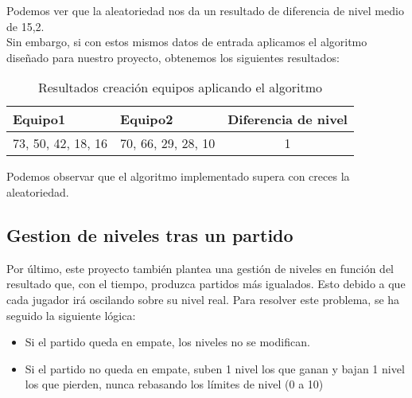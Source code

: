Podemos ver que la aleatoriedad nos da un resultado de diferencia de nivel medio de 15,2.\\

Sin embargo, si con estos mismos datos de entrada aplicamos el algoritmo diseñado para nuestro proyecto, obtenemos los siguientes resultados:\\
\begin{table}[h]
    \centering
    \begin{center}
        \begin{tabular}{| l | l | c |}
            \hline
            \textbf{Equipo1} & \textbf{Equipo2} & \textbf{Diferencia de nivel}\\
            \hline
            73, 50, 42, 18, 16 & 70, 66, 29, 28, 10 & 1\\
            \hline
        \end{tabular}
        \caption{Resultados creación equipos aplicando el algoritmo}
    \end{center}
\end{table}

Podemos observar que el algoritmo implementado supera con creces la aleatoriedad.

\subsection{Gestion de niveles tras un partido}

Por último, este proyecto también plantea una gestión de niveles en función del resultado que, con el tiempo, produzca partidos más igualados. Esto debido a que cada jugador irá oscilando sobre su nivel real.
Para resolver este problema, se ha seguido la siguiente lógica:

\begin{itemize}
    \item Si el partido queda en empate, los niveles no se modifican.
    \item Si el partido no queda en empate, suben 1 nivel los que ganan y bajan 1 nivel los que pierden, nunca rebasando los límites de nivel (0 a 10)
    
\end{itemize}
